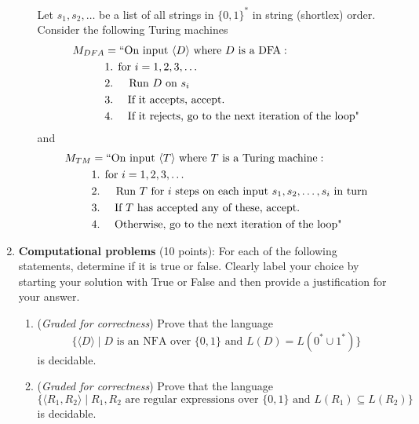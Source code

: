 \documentclass[12pt, oneside]{article}
\newcommand{\gradeCorrect}{({\it Graded for correctness}) }
\begin{document}
\begin{enumerate}[wide, labelwidth=!, labelindent=0pt]
\begin{enumerate}
    Let $s_1, s_2, \ldots$ be a list of all strings in 
    $\{0,1\}^*$ in string (shortlex) order. Consider the following Turing machines
    \begin{align*}
        M_{DFA} &= ``\text{On input $\langle D \rangle$ where $D$ is a DFA}:\\
         &\text{1. for $i=1, 2, 3, \ldots$} \\
         &\text{2.~~~ Run $D$ on $s_i$} \\
         &\text{3.~~~~If it accepts, accept.}\\
         &\text{4.~~~~If it rejects, go to the next iteration of the loop"}\\
     \end{align*}
     and
     \begin{align*}
        M_{TM} &= ``\text{On input $\langle T \rangle$ where $T$ is a Turing machine}:\\
         &\text{1. for $i=1, 2, 3, \ldots$} \\
         &\text{2.~~~ Run $T$ for $i$ steps on each input $s_1, s_2, \ldots, s_i$ in turn} \\
         &\text{3.~~~~If $T$ has accepted any of these, accept.}\\
         &\text{4.~~~~Otherwise, go to the next iteration of the loop"}\\
     \end{align*}
\end{enumerate}


\item\textbf{Computational problems} (10 points):
For each of the following statements, determine if it is true or false. 
Clearly label your choice by starting your solution with True or False and then provide a 
 justification for your answer.

\begin{enumerate}
    \item\gradeCorrect Prove that the language $$\{\langle D \rangle \mid D \text{ is an NFA over $\{0,1\}$ and } L(D) = L(0^*\cup 1^*) \}$$
    is decidable.
    \item\gradeCorrect Prove that the language $$\{\langle R_1, R_2 \rangle \mid R_1, R_2 \text{ are regular expressions over $\{0,1\}$ and } L(R_1) \subseteq L(R_2) \}$$ is decidable.
\end{enumerate}

\end{enumerate}
\newpage
\titleformat{\subsubsection}[runin]
   {\normalfont\bfseries}{}{}{}
   
\end{document}
